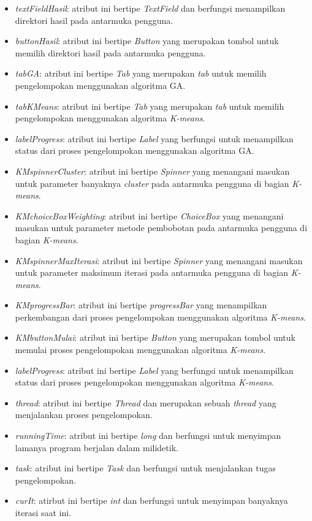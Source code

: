 \begin{itemize}
	\item \textit{textFieldHasil}: atribut ini bertipe \textit{TextField} dan berfungsi menampilkan direktori hasil pada antarmuka pengguna.
	\item \textit{buttonHasil}: atribut ini bertipe \textit{Button} yang merupakan tombol untuk memilih direktori hasil pada antarmuka pengguna.
	\item \textit{tabGA}: atribut ini bertipe \textit{Tab} yang merupakan \textit{tab} untuk memilih pengelompokan menggunakan algoritma GA.
	\item \textit{tabKMeans}: atribut ini bertipe \textit{Tab} yang merupakan \textit{tab} untuk memilih pengelompokan menggunakan algoritma \textit{K-means}.
	\item \textit{labelProgress}: atribut ini bertipe \textit{Label} yang berfungsi untuk menampilkan status dari proses pengelompokan menggunakan algoritma GA.
	\item \textit{KMspinnerCluster}: atribut ini bertipe \textit{Spinner} yang menangani masukan untuk parameter banyaknya \textit{cluster} pada antarmuka pengguna di bagian \textit{K-means}.
	\item \textit{KMchoiceBoxWeighting}: atribut ini bertipe \textit{ChoiceBox} yang menangani masukan untuk parameter metode pembobotan pada antarmuka pengguna di bagian \textit{K-means}.
	\item \textit{KMspinnerMaxIterasi}: atribut ini bertipe \textit{Spinner} yang menangani masukan untuk parameter maksimum iterasi pada antarmuka pengguna di bagian \textit{K-means}.
	\item \textit{KMprogressBar}: atribut ini bertipe \textit{progressBar} yang menampilkan perkembangan dari proses pengelompokan menggunakan algoritma \textit{K-means}.
	\item \textit{KMbuttonMulai}: atribut ini bertipe \textit{Button} yang merupakan tombol untuk memulai proses pengelompokan menggunakan algoritma \textit{K-means}.
	\item \textit{labelProgress}: atribut ini bertipe \textit{Label} yang berfungsi untuk menampilkan status dari proses pengelompokan menggunakan algoritma \textit{K-means}.
	\item \textit{thread}: atribut ini bertipe \textit{Thread} dan merupakan sebuah \textit{thread} yang menjalankan proses pengelompokan.
	\item \textit{runningTime}: atribut ini bertipe \textit{long} dan berfungsi untuk menyimpan lamanya program berjalan dalam milidetik.
	\item \textit{task}: atribut ini bertipe \textit{Task} dan berfungsi untuk menjalankan tugas pengelompokan.
	\item \textit{curIt}: atirbut ini bertipe \textit{int} dan berfungsi untuk menyimpan banyaknya iterasi saat ini.
\end{itemize}

